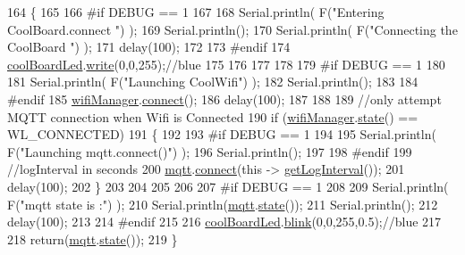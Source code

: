 \begin{DoxyCode}
164 \{
165 
166 \textcolor{preprocessor}{#if DEBUG == 1  }
167 
168     Serial.println( F(\textcolor{stringliteral}{"Entering CoolBoard.connect "}) );
169     Serial.println();
170     Serial.println( F(\textcolor{stringliteral}{"Connecting the CoolBoard  "}) );
171     delay(100);
172 
173 \textcolor{preprocessor}{#endif}
174     \hyperlink{classCoolBoard_a1b1d3c684a5baa56b08486e192fd8e97}{coolBoardLed}.\hyperlink{classCoolBoardLed_a30fadd4cbec17ceea428bf7a32207e87}{write}(0,0,255);\textcolor{comment}{//blue}
175 
176     
177             
178     
179 \textcolor{preprocessor}{#if DEBUG == 1      }
180 
181     Serial.println( F(\textcolor{stringliteral}{"Launching CoolWifi"}) );
182     Serial.println();
183 
184 \textcolor{preprocessor}{#endif}
185     \hyperlink{classCoolBoard_acd88e6003606b47479ebba81e4aceeca}{wifiManager}.\hyperlink{classCoolWifi_ad060353050f40d032a2dbf9e54a768bf}{connect}();
186     delay(100);
187 
188 
189     \textcolor{comment}{//only attempt MQTT connection when Wifi is Connected}
190     \textcolor{keywordflow}{if} (\hyperlink{classCoolBoard_acd88e6003606b47479ebba81e4aceeca}{wifiManager}.\hyperlink{classCoolWifi_a1c7b4d82a4098d346e7593dce92039fa}{state}() == WL\_CONNECTED)
191     \{
192 
193 \textcolor{preprocessor}{    #if DEBUG == 1  }
194     
195         Serial.println( F(\textcolor{stringliteral}{"Launching mqtt.connect()"}) );
196         Serial.println();
197     
198 \textcolor{preprocessor}{    #endif  }
199         \textcolor{comment}{//logInterval in seconds}
200         \hyperlink{classCoolBoard_a2399f44d7c23c1149a335cb3b46d90f1}{mqtt}.\hyperlink{classCoolMQTT_a50075d0ab23a327ab897fd6adad20eda}{connect}(\textcolor{keyword}{this} -> \hyperlink{classCoolBoard_a7508e029f2ee17bb747ffab599285e0d}{getLogInterval}());
201         delay(100);
202     \}
203     
204         
205     
206     
207 \textcolor{preprocessor}{#if DEBUG == 1}
208 
209     Serial.println( F(\textcolor{stringliteral}{"mqtt state is :"}) );
210     Serial.println(\hyperlink{classCoolBoard_a2399f44d7c23c1149a335cb3b46d90f1}{mqtt}.\hyperlink{classCoolMQTT_a5d003307eff78efbd585e42b43b72b6d}{state}());
211     Serial.println();
212     delay(100);
213 
214 \textcolor{preprocessor}{#endif}
215 
216     \hyperlink{classCoolBoard_a1b1d3c684a5baa56b08486e192fd8e97}{coolBoardLed}.\hyperlink{classCoolBoardLed_a96e1ea13003eee34c9dbcef340404426}{blink}(0,0,255,0.5);\textcolor{comment}{//blue}
217 
218     \textcolor{keywordflow}{return}(\hyperlink{classCoolBoard_a2399f44d7c23c1149a335cb3b46d90f1}{mqtt}.\hyperlink{classCoolMQTT_a5d003307eff78efbd585e42b43b72b6d}{state}());
219 \}
\end{DoxyCode}
